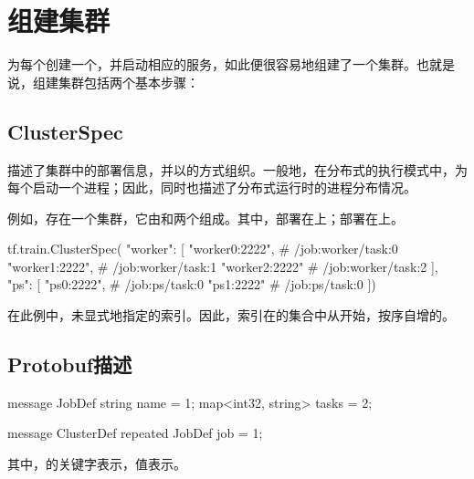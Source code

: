 \section{组建集群}

\begin{content}

为每个创建一个，并启动相应的服务，如此便很容易地组建了一个集群。也就是说，组建集群包括两个基本步骤：

\begin{enum}
\end{enum}

\subsection{ClusterSpec}

描述了集群中的部署信息，并以的方式组织。一般地，在分布式的执行模式中，为每个启动一个进程；因此，同时也描述了分布式运行时的进程分布情况。

例如，存在一个集群，它由和两个组成。其中，部署在上；部署在上。

\begin{leftbar}
\begin{python}
tf.train.ClusterSpec({
  "worker": [
    "worker0:2222",   # /job:worker/task:0
    "worker1:2222",   # /job:worker/task:1
    "worker2:2222"    # /job:worker/task:2
  ],  
  "ps": [
    "ps0:2222",       # /job:ps/task:0
    "ps1:2222"        # /job:ps/task:0
  ]})
\end{python}
\end{leftbar}

在此例中，未显式地指定的索引。因此，索引在的集合中从开始，按序自增的。

\subsection{Protobuf描述}

\begin{leftbar}
\begin{python}
message JobDef {
  string name = 1;
  map<int32, string> tasks = 2;
}

message ClusterDef {
  repeated JobDef job = 1;
}
\end{python}
\end{leftbar}

其中，的关键字表示，值表示。

\end{content}

